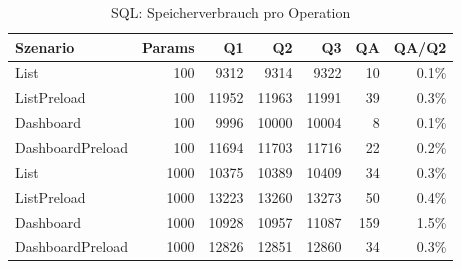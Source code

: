 \begin{table}[ht]
\centering
\caption{SQL: Speicherverbrauch pro Operation}
\begin{tabular}{lrrrrrr}
\toprule
Szenario & Params & Q1 & Q2 & Q3 & QA & QA/Q2 \\
\midrule
		List & 100 & 9312 & 9314 & 9322 & 10 & 0.1\% \\
		ListPreload & 100 & 11952 & 11963 & 11991 & 39 & 0.3\% \\
		Dashboard & 100 & 9996 & 10000 & 10004 & 8 & 0.1\% \\
		DashboardPreload & 100 & 11694 & 11703 & 11716 & 22 & 0.2\% \\
		List & 1000 & 10375 & 10389 & 10409 & 34 & 0.3\% \\
		ListPreload & 1000 & 13223 & 13260 & 13273 & 50 & 0.4\% \\
		Dashboard & 1000 & 10928 & 10957 & 11087 & 159 & 1.5\% \\
		DashboardPreload & 1000 & 12826 & 12851 & 12860 & 34 & 0.3\% \\
\bottomrule
\end{tabular}
\label{tab:benchmark_sql_bytesperop}
\end{table}
	